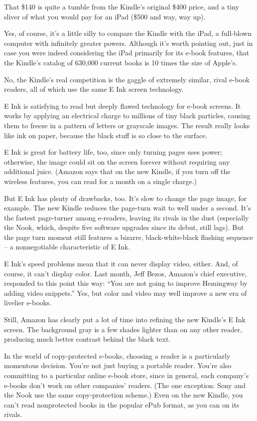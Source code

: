 ﻿\documentclass[12pt]{article}
\begin{document}
That \$140 is quite a tumble from the Kindle's original \$400 price, and a tiny sliver of what you
would pay for an iPad (\$500 and way, way up).

Yes, of course, it's a little silly to compare the Kindle with the iPad, a full-blown computer with
infinitely greater powers. Although it's worth pointing out, just in case you were indeed
considering the iPad primarily for its e-book features, that the Kindle's catalog of 630,000 current
books is 10 times the size of Apple's.

No, the Kindle's real competition is the gaggle of extremely similar, rival e-book readers, all of
which use the same E Ink screen technology.

E Ink is satisfying to read but deeply flawed technology for e-book screens. It works by applying an
electrical charge to millions of tiny black particles, causing them to freeze in a pattern of
letters or grayscale images. The result really looks like ink on paper, because the black stuff is
so close to the surface.

E Ink is great for battery life, too, since only turning pages uses power; otherwise, the image
could sit on the screen forever without requiring any additional juice. (Amazon says that on the new
Kindle, if you turn off the wireless features, you can read for a month on a single charge.)

But E Ink has plenty of drawbacks, too. It's slow to change the page image, for example. The new
Kindle reduces the page-turn wait to well under a second. It's the fastest page-turner among
e-readers, leaving its rivals in the dust (especially the Nook, which, despite five software
upgrades since its debut, still lags). But the page turn moment still features a bizarre,
black-white-black flashing sequence -- a nonnegotiable characteristic of E Ink.

E Ink's speed problems mean that it can never display video, either. And, of course, it can't
display color. Last month, Jeff Bezos, Amazon's chief executive, responded to this point this way:
``You are not going to improve Hemingway by adding video snippets.'' Yes, but color and video may
well improve a new era of livelier e-books.

Still, Amazon has clearly put a lot of time into refining the new Kindle's E Ink screen. The
background gray is a few shades lighter than on any other reader, producing much better contrast
behind the black text.

In the world of copy-protected e-books, choosing a reader is a particularly momentous decision.
You're not just buying a portable reader. You're also committing to a particular online e-book
store, since in general, each company's e-books don't work on other companies' readers. (The one
exception: Sony and the Nook use the same copy-protection scheme.) Even on the new Kindle, you can't
read nonprotected books in the popular ePub format, as you can on its rivals.
\end{document}
